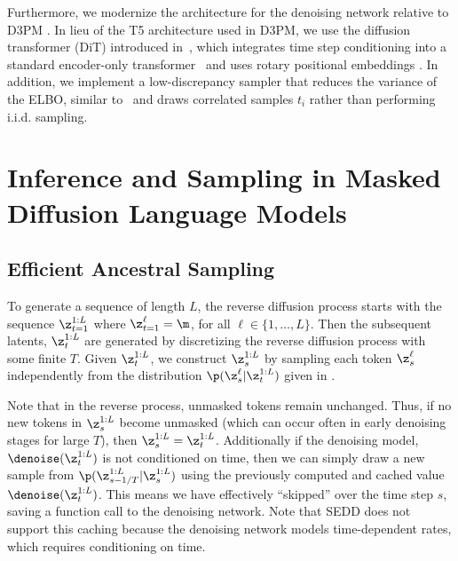 \documentclass{article} %
\begin{document}
Furthermore, we modernize the architecture for the denoising network relative to D3PM \citep{austin2021structured}. 
In lieu of the T5 architecture used in D3PM, we use the diffusion transformer (DiT) introduced in~\citet{peebles2023scalable}, which integrates time step conditioning into a standard encoder-only transformer~\citep{vaswani2017attention} and uses rotary positional embeddings \citep{su2021roformer}.
In addition, we implement a low-discrepancy sampler that reduces the variance of the ELBO, similar to~\citet{kingma2021variational} and draws correlated samples $t_i$ rather than performing i.i.d. sampling.






\section{Inference and Sampling in Masked Diffusion Language Models}





\subsection{Efficient Ancestral Sampling}\label{subsec:efficient_sampling}

To generate a sequence of length $L$,
the reverse diffusion process starts with the sequence $\z^{1:L}_{t=1}$ where $\z^{\ell}_{t=1} = \m$, for all $\ell \in \{1, \dots, L\}$.
Then the subsequent latents, $\z^{1:L}_{t}$ are generated by discretizing the reverse diffusion process with some finite $T.$
Given $\z^{1:L}_t$, we construct $\z^{1:L}_{s}$ by sampling each token $\z^\ell_{s}$ independently from the distribution $\p(\z^\ell_{s} | \z^{1:L}_{t})$ given in .

Note that in the reverse process, unmasked tokens remain unchanged.
Thus, if no new tokens in $\z^{1:L}_{s}$ become unmasked (which can occur often in early denoising stages for large $T$), then $\z^{1:L}_{s} = \z^{1:L}_{t}$. 
Additionally if the denoising model, $\denoise(\z^{1:L}_{t})$ is not conditioned on time,
then we can simply draw a new sample from $\p(\z^{1:L}_{s-1/T} | \z^{1:L}_{s})$ using the previously computed and cached value $\denoise(\z^{1:L}_{t})$.
This means we have effectively ``skipped'' over the time step $s$, saving a function call to the denoising network.
Note that SEDD \cite{lou2023discrete} does not support this caching because the denoising network models time-dependent rates, which requires conditioning on time.
\end{document}
